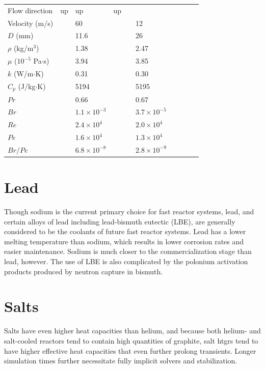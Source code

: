 \documentclass[10pt]{article}
\numberwithin{equation}{section} %
\begin{document}
\begin{table}
\begin{table}[H]
\begin{tabular}{l l l l l l l l l l}
 Flow direction						& up			& up			& up\\
 \hdashline
 Velocity (m/s)						& 			& 60			& 			& 			& 12\\
  \(D\) (mm)						&			& 11.6		&			& 			& 26\\
 \(\rho\) (kg/\(\textrm{m}^3\))			&			& 1.38		& 			&			& 2.47\\
 \(\mu\) (\(10^{-5}\) Pa\(\cdot\)s)			& 			& 3.94		& 			&			& 3.85\\
 \(k\) (W/m\(\cdot\)K)					& 			& 0.31		& 			&			& 0.30\\
 \(C_p\) (J/kg\(\cdot\)K)				& 			& 5194		& 			&			& 5195\\
 \hdashline
 \(Pr\)							& 			& 0.66		& 			&			& 0.67\\
 \(Br\)							&			& \(1.1\times10^{-3}\)		& & 			& \(3.7\times10^{-5}\)\\
 \(Re\)							&			& \(2.4\times10^{4}\)		& &				& \(2.0\times10^4\) \\
 \(Pe\)							&			& \(1.6\times10^{4}\)					& &	& \(1.3\times10^4\)\\
 \(Br/Pe\)							& 			& \(6.8\times10^{-8}\)	&	&			& \(2.8\times10^{-9}\)\\
\hline
\end{tabular}
\label{table:HeliumReactors}
\end{table}
\end{table}

\section{Lead}

Though sodium is the current primary choice for fast reactor systems, lead, and certain alloys of lead including lead-bismuth eutectic (LBE), are generally considered to be the coolants of future fast reactor systems. Lead has a lower melting temperature than sodium, which results in lower corrosion rates and easier maintenance. Sodium is much closer to the commercialization stage than lead, however. The use of LBE is also complicated by the polonium activation products produced by neutron capture in bismuth.

\section{Salts}

Salts have even higher heat capacities than helium, and because both helium- and salt-cooled reactors tend to contain high quantities of graphite, salt \gls{htgr}s tend to have higher effective heat capacities that even further prolong transients. Longer simulation times further necessitate fully implicit solvers and stabilization. 
\end{document}
